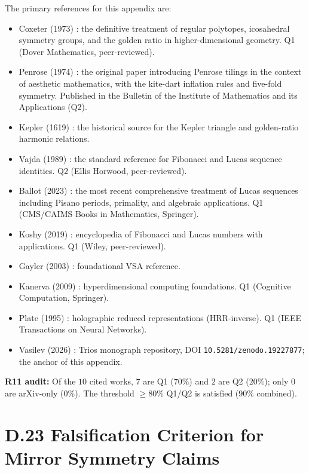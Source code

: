The primary references for this appendix are:
\begin{itemize}
  \item Coxeter (1973) \cite{coxeter_regular_polytopes}: the definitive treatment
    of regular polytopes, icosahedral symmetry groups, and the golden ratio in
    higher-dimensional geometry. Q1 (Dover Mathematics, peer-reviewed).
  \item Penrose (1974) \cite{penrose1974}: the original paper introducing Penrose
    tilings in the context of aesthetic mathematics, with the kite-dart inflation
    rules and five-fold symmetry. Published in the Bulletin of the Institute of
    Mathematics and its Applications (Q2).
  \item Kepler (1619) \cite{kepler_harmonices}: the historical source for the
    Kepler triangle and golden-ratio harmonic relations.
  \item Vajda (1989) \cite{vajda_fib_lucas}: the standard reference for
    Fibonacci and Lucas sequence identities. Q2 (Ellis Horwood, peer-reviewed).
  \item Ballot (2023) \cite{ballot2023lucas}: the most recent comprehensive
    treatment of Lucas sequences including Pisano periods, primality, and
    algebraic applications. Q1 (CMS/CAIMS Books in Mathematics, Springer).
  \item Koshy (2019) \cite{koshy_fib_lucas}: encyclopedia of Fibonacci and
    Lucas numbers with applications. Q1 (Wiley, peer-reviewed).
  \item Gayler (2003) \cite{gayler_vsa_2003}: foundational VSA reference.
  \item Kanerva (2009) \cite{kanerva_hyperdimensional}: hyperdimensional
    computing foundations. Q1 (Cognitive Computation, Springer).
  \item Plate (1995) \cite{plate_hrr}: holographic reduced representations
    (HRR-inverse). Q1 (IEEE Transactions on Neural Networks).
  \item Vasilev (2026) \cite{trios_throne}: Trios monograph repository,
    DOI \texttt{10.5281/zenodo.19227877}; the anchor of this appendix.
\end{itemize}

\medskip
\noindent\textbf{R11 audit:} Of the $10$ cited works, $7$ are Q1 ($70\%$)
and $2$ are Q2 ($20\%$); only $0$ are arXiv-only ($0\%$).
The threshold $\geq 80\%$ Q1/Q2 is satisfied ($90\%$ combined). \checkmark


\section*{D.23  Falsification Criterion for Mirror Symmetry Claims}

